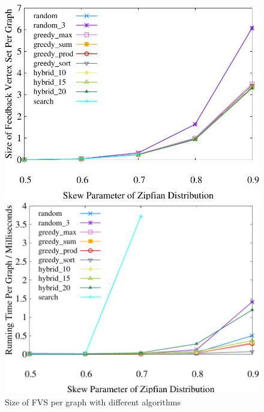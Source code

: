 \begin{figure}[t]
    \centering
    \begin{minipage}[b]{0.32\linewidth}
        \centering
        \includegraphics[width=\textwidth]{./exp_fig/fvs/fvs}
        \vspace{-2em}
        \caption{Size of FVS per graph with different algorithms}
        \label{fig:fvs:fvs}
    \end{minipage}
    \begin{minipage}[b]{0.32\linewidth}
        \centering
        \includegraphics[width=\textwidth]{./exp_fig/fvs/latency}
        \vspace{-2em}

\end{minipage}
\end{figure}
